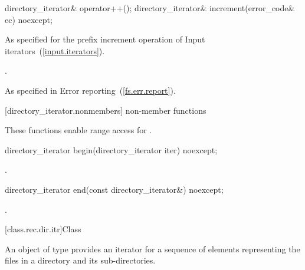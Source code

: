 \begin{itemdecl}
directory_iterator& operator++();
directory_iterator& increment(error_code& ec) noexcept;
\end{itemdecl}

\begin{itemdescr}

\pnum
\effects As specified for the prefix increment operation of
Input iterators~(\ref{input.iterators}).

\pnum
\returns {}.

\pnum
\throws As specified in Error reporting~(\ref{fs.err.report}).

\end{itemdescr}

[directory_iterator.nonmembers]{ non-member functions}

\pnum
These functions enable range access for .
\begin{itemdecl}
directory_iterator begin(directory_iterator iter) noexcept;
\end{itemdecl}

\begin{itemdescr}
\pnum
\returns {}.
\end{itemdescr}

\begin{itemdecl}
directory_iterator end(const directory_iterator&) noexcept;
\end{itemdecl}

\begin{itemdescr}
\pnum
\returns {}.
\end{itemdescr}

[class.rec.dir.itr]{Class }

\pnum
An object of type  provides an iterator for
a sequence of  elements representing the files in a
directory and its sub-directories.


